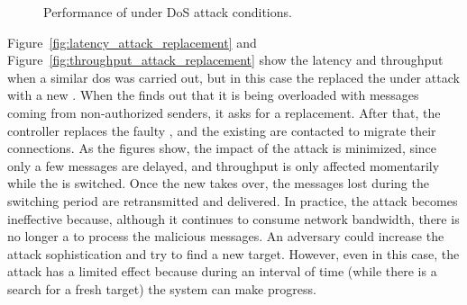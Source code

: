 \begin{figure}[h]
\hspace{-5mm}
\hspace{-5mm}
\caption{Performance of \sieveq under DoS attack conditions.}
\end{figure}


Figure~\ref{fig:latency_attack_replacement} and Figure~\ref{fig:throughput_attack_replacement} show the latency and throughput when a similar \gls{dos} was carried out, but in this case the \sieveq replaced the \presieve under attack with a new \presieve.
When the \presieve finds out that it is being overloaded with messages coming from non-authorized senders, it asks for a replacement.
After that, the controller replaces the faulty \presieve, and the existing \senders are contacted to migrate their connections.
As the figures show, the impact of the attack is minimized, since only a few messages are delayed, and throughput is only affected momentarily while the \presieve is switched.
Once the new \presieve takes over, the messages lost during the switching period are retransmitted and delivered.
In practice, the attack becomes ineffective because, although it continues to consume network bandwidth, there is no longer a \presieve to process the malicious messages.
An adversary could increase the attack sophistication and try to find a new \presieve target.
However, even in this case, the attack has a limited effect because during an interval of time (while there is a search for a fresh target) the system can make progress.

